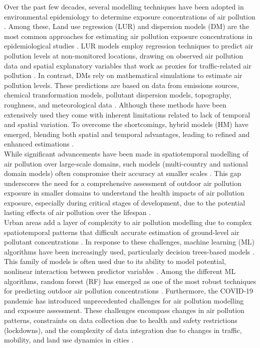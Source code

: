 \documentclass{article}
\begin{document}
Over the past few decades, several modelling techniques have been adopted in environmental epidemiology to determine exposure concentrations of air pollution \cite{hoek2017, di2019no2, di2019pm25, stafoggia2019, stafoggia2020}. Among these, Land use regression (LUR) and dispersion models (DM) are the most common approaches for estimating air pollution exposure concentrations in epidemiological studies \cite{gulliver2015, dehoogh2014}. LUR models employ regression techniques to predict air pollution levels at non-monitored locations, drawing on observed air pollution data and spatial explanatory variables that work as proxies for traffic-related air pollution \cite{briggs1997, hoek2008}. In contrast, DMs rely on mathematical simulations to estimate air pollution levels. These predictions are based on data from emissions sources, chemical transformation models, pollutant dispersion models, topography, roughness, and meteorological data \cite{hoek2017}. Although these methods have been extensively used they come with inherent limitations related to lack of temporal and spatial variation. To overcome the shortcomings, hybrid models (HM) have emerged, blending both spatial and temporal advantages, leading to refined and enhanced estimations \cite{hoek2017, korek2017, tularam2021, oh2021}. \\

While significant advancements have been made in spatiotemporal modelling of air pollution over large-scale domains, such models (multi-country and national domain models) often compromise their accuracy at smaller scales \cite{dehoogh2016, chen2019, chen2020, shen2022}. This gap underscores the need for a comprehensive assessment of outdoor air pollution exposure in smaller domains to understand the health impacts of air pollution exposure, especially during critical stages of development, due to the potential lasting effects of air pollution over the lifespan \cite{selevan2000, wick2010, ghosh2021}. \\

Urban areas add a layer of complexity to air pollution modelling due to complex spatiotemporal patterns that difficult accurate estimation of ground-level air pollutant concentrations \cite{sokhi2022}. In response to these challenges, machine learning (ML) algorithms have been increasingly used, particularly decision trees-based models \cite{liu2022}. This family of models is often used due to its ability to model potential, nonlinear interaction between predictor variables \cite{liu2022treebased}. Among the different ML algorithms, random forest (RF) has emerged as one of the most robust techniques for predicting outdoor air pollution concentrations \cite{chen2019, chen2020, stafoggia2019, stafoggia2020, schneider2020, mila2023}. Furthermore, the COVID-19 pandemic has introduced unprecedented challenges for air pollution modelling and exposure assessment. These challenges encompass changes in air pollution patterns, constraints on data collection due to health and safety restrictions (lockdowns), and the complexity of data integration due to changes in traffic, mobility, and land use dynamics in cities \cite{gonzalez2022, querol2021}. \\
 
\end{document}
